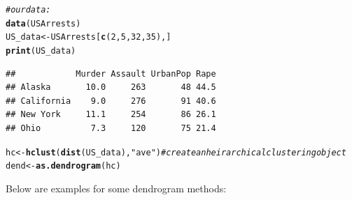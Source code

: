 \documentclass[shortnames,nojss,article]{jss}\usepackage[]{graphicx}\usepackage[]{color}
\makeatletter
\newcommand{\hlnum}[1]{\textcolor[rgb]{0.686,0.059,0.569}{#1}}%
\newcommand{\hlstr}[1]{\textcolor[rgb]{0.192,0.494,0.8}{#1}}%
\newcommand{\hlcom}[1]{\textcolor[rgb]{0.678,0.584,0.686}{\textit{#1}}}%
\newcommand{\hlstd}[1]{\textcolor[rgb]{0.345,0.345,0.345}{#1}}%
\newcommand{\hlkwb}[1]{\textcolor[rgb]{0.69,0.353,0.396}{#1}}%
\newcommand{\hlkwd}[1]{\textcolor[rgb]{0.737,0.353,0.396}{\textbf{#1}}}%
\newenvironment{kframe}{%
 \def\at@end@of@kframe{}%
 \ifinner\ifhmode%
  \def\at@end@of@kframe{\end{minipage}}%
  \begin{minipage}{\columnwidth}%
 \fi\fi%
 \def\FrameCommand##1{\hskip\@totalleftmargin \hskip-\fboxsep
 \colorbox{shadecolor}{##1}\hskip-\fboxsep
     \hskip-\linewidth \hskip-\@totalleftmargin \hskip\columnwidth}%
 \MakeFramed {\advance\hsize-\width
   \@totalleftmargin\z@ \linewidth\hsize
   \@setminipage}}%
 {\par\unskip\endMakeFramed%
 \at@end@of@kframe}
\newenvironment{knitrout}{}{} %
\makeatother
\begin{document}
\begin{knitrout}
\color{fgcolor}\begin{kframe}
\begin{alltt}
\hlcom{# our data:}
\hlkwd{data}\hlstd{(USArrests)}
\hlstd{US_data} \hlkwb{<-} \hlstd{USArrests[}\hlkwd{c}\hlstd{(}\hlnum{2}\hlstd{,} \hlnum{5}\hlstd{,} \hlnum{32}\hlstd{,} \hlnum{35}\hlstd{), ]}
\hlkwd{print}\hlstd{(US_data)}
\end{alltt}
\begin{verbatim}
##            Murder Assault UrbanPop Rape
## Alaska       10.0     263       48 44.5
## California    9.0     276       91 40.6
## New York     11.1     254       86 26.1
## Ohio          7.3     120       75 21.4
\end{verbatim}
\begin{alltt}
\hlstd{hc} \hlkwb{<-} \hlkwd{hclust}\hlstd{(}\hlkwd{dist}\hlstd{(US_data),} \hlstr{"ave"}\hlstd{)}  \hlcom{# create an heirarchical clustering object}
\hlstd{dend} \hlkwb{<-} \hlkwd{as.dendrogram}\hlstd{(hc)}
\end{alltt}
\end{kframe}
\end{knitrout}



Below are examples for some dendrogram methods:
\end{document}
